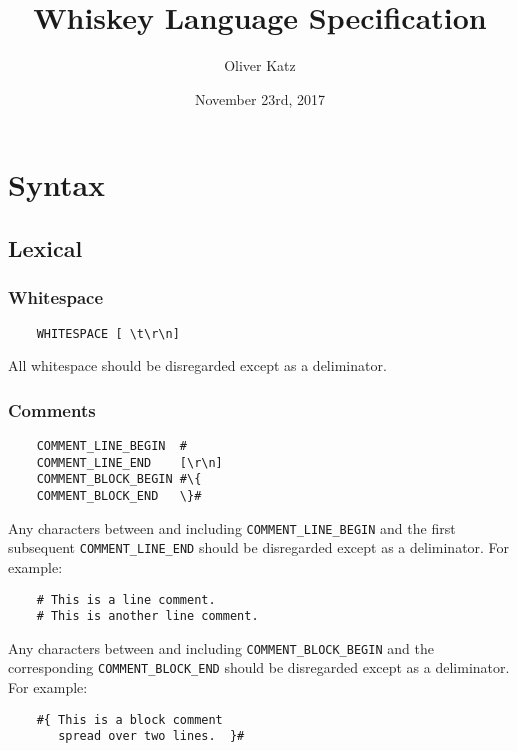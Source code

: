 \documentclass[11pt, a4paper, twoside]{article}
\title{Whiskey Language Specification}
\author{Oliver Katz}
\date{November 23rd, 2017}
\begin{document}
\maketitle

\tableofcontents

\section{Syntax}

  \subsection{Lexical}

    \newpage

    \subsubsection{Whitespace}

    \begin{verbatim}
    WHITESPACE [ \t\r\n]
    \end{verbatim}

    All whitespace should be disregarded except as a deliminator.

    \newpage

    \subsubsection{Comments}

    \begin{verbatim}
    COMMENT_LINE_BEGIN  #
    COMMENT_LINE_END    [\r\n]
    COMMENT_BLOCK_BEGIN #\{
    COMMENT_BLOCK_END   \}#
    \end{verbatim}

    Any characters between and including \verb|COMMENT_LINE_BEGIN| and the first subsequent \verb|COMMENT_LINE_END| should be disregarded except as a deliminator. For example:

    \begin{verbatim}
    # This is a line comment.
    # This is another line comment.
    \end{verbatim}

    Any characters between and including \verb|COMMENT_BLOCK_BEGIN| and the corresponding \verb|COMMENT_BLOCK_END| should be disregarded except as a deliminator. For example:

    \begin{verbatim}
    #{ This is a block comment
       spread over two lines.  }#
    \end{verbatim}
\end{document}
